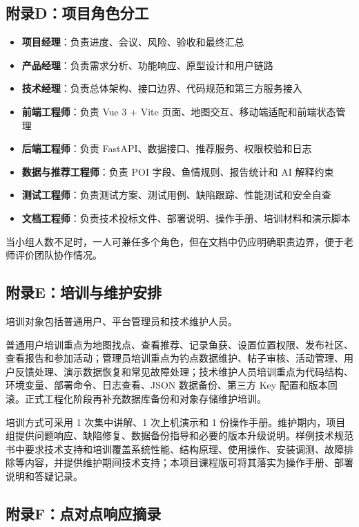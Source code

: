 \subsection{附录D：项目角色分工}

\begin{itemize}
  \item \textbf{项目经理}：负责进度、会议、风险、验收和最终汇总
  \item \textbf{产品经理}：负责需求分析、功能响应、原型设计和用户链路
  \item \textbf{技术经理}：负责总体架构、接口边界、代码规范和第三方服务接入
  \item \textbf{前端工程师}：负责 Vue 3 + Vite 页面、地图交互、移动端适配和前端状态管理
  \item \textbf{后端工程师}：负责 FastAPI、数据接口、推荐服务、权限校验和日志
  \item \textbf{数据与推荐工程师}：负责 POI 字段、鱼情规则、报告统计和 AI 解释约束
  \item \textbf{测试工程师}：负责测试方案、测试用例、缺陷跟踪、性能测试和安全自查
  \item \textbf{文档工程师}：负责技术投标文件、部署说明、操作手册、培训材料和演示脚本
\end{itemize}

当小组人数不足时，一人可兼任多个角色，但在文档中仍应明确职责边界，便于老师评价团队协作情况。

\subsection{附录E：培训与维护安排}

培训对象包括普通用户、平台管理员和技术维护人员。

普通用户培训重点为地图找点、查看推荐、记录鱼获、设置位置权限、发布社区、查看报告和参加活动；管理员培训重点为钓点数据维护、帖子审核、活动管理、用户反馈处理、演示数据恢复和常见故障处理；技术维护人员培训重点为代码结构、环境变量、部署命令、日志查看、JSON 数据备份、第三方 Key 配置和版本回滚。正式工程化阶段再补充数据库备份和对象存储维护培训。

培训方式可采用 1 次集中讲解、1 次上机演示和 1 份操作手册。维护期内，项目组提供问题响应、缺陷修复、数据备份指导和必要的版本升级说明。样例技术规范书中要求技术支持和培训覆盖系统性能、结构原理、使用操作、安装调测、故障排除等内容，并提供维护期间技术支持；本项目课程版可将其落实为操作手册、部署说明和答疑记录。

\subsection{附录F：点对点响应摘录}

